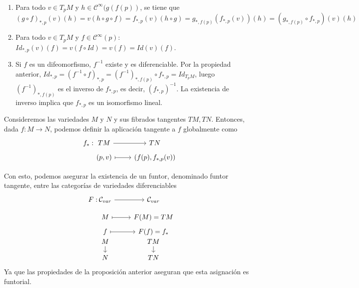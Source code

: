 \begin{demx} \, 
\begin{enumerate}
    \item Para todo $v \in T_pM$ y $h \in \mathcal{C}^{\infty}(g(f(p))$, se tiene que $(g\circ f)_{*,p}(v)(h) = v(h \circ g \circ f) = f_{*,p}(v)(h \circ g) = g_{*,f(p)}(f_{*,p}(v))(h) =  (g_{*,f(p)} \circ f_{*,p})(v)(h)$
    \item Para todo $v \in T_pM$ y $f\in \mathcal{C}^{\infty}(p)$: $Id_{*,p}(v)(f) = v(f \circ Id) = v(f) = Id(v)(f)$.
    \item Si $f$ es un difeomorfismo, $f^{-1}$ existe y es diferenciable. Por la propiedad anterior, $Id_{*,p} = (f^{-1} \circ f)_{*,p} = (f^{-1})_{*,f(p)} \circ f_{*,p} = Id_{T_pM}$, luego $(f^{-1})_{*,f(p)}$ es el inverso de $f_{*,p}$, es decir, $(f_{*,p})^{-1}$. La existencia de inverso implica que $f_{*,p}$ es un isomorfismo lineal.
\end{enumerate}
\end{demx}

\begin{obs}
Consideremos las variedades $M$ y $N$ y sus fibrados tangentes $TM,TN$. Entonces, dada $f:M \to N$, podemos definir la aplicación tangente a $f$ globalmente como
$$\begin{tikzcd}
f_*: \hspace{-12mm} & TM \rar & TN\\[-5mm]
& (p, v) \arrow[mapsto]{r} & (f(p),f_{*,p}(v))
\end{tikzcd}$$

Con esto, podemos asegurar la existencia de un funtor, denominado funtor tangente, entre las categorías de variedades diferenciables $$\begin{tikzcd}
F: \hspace{-14mm} & \mathcal{C}_{var} \rar & \mathcal{C}_{var}\\[-3mm]
& M \arrow[mapsto]{r} & F(M) = TM\\[-5mm]
& f \arrow[mapsto]{r} & F(f) = f_*\\[-7mm]
& M \dar & TM \dar\\[-3mm]
& N & TN
\end{tikzcd}$$
Ya que las propiedades de la proposición anterior aseguran que esta asignación es funtorial.
\end{obs}

